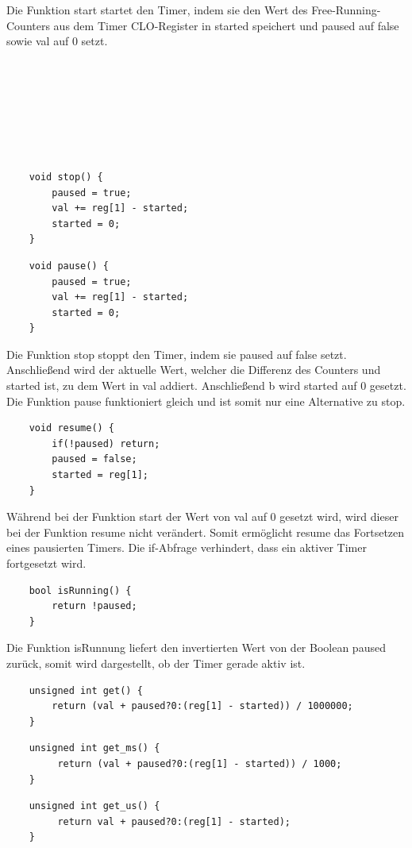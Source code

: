 \documentclass[12pt]{article}
\begin{document}
Die Funktion start startet den Timer, indem sie den Wert des Free-Running-Counters aus dem Timer CLO-Register in started speichert und paused auf false sowie val auf 0 setzt.\\\\\\\\\\\\\\\
\begin{verbatim}
    void stop() {
        paused = true;
        val += reg[1] - started;
        started = 0;
    }
\end{verbatim}
\begin{verbatim}
    void pause() {
        paused = true;
        val += reg[1] - started;
        started = 0;
    }
\end{verbatim}
Die Funktion stop stoppt den Timer, indem sie paused auf false setzt. Anschließend wird der aktuelle Wert, welcher die Differenz des Counters und started ist, zu dem Wert in val addiert. Anschließend b wird started auf 0 gesetzt. Die Funktion pause funktioniert gleich und ist somit nur eine Alternative zu stop.\\
\begin{verbatim}
    void resume() {
        if(!paused) return;
        paused = false;
        started = reg[1];
    }
\end{verbatim} 
Während bei der Funktion start der Wert von val auf 0 gesetzt wird, wird dieser bei der Funktion resume nicht verändert. Somit ermöglicht resume das Fortsetzen eines pausierten Timers. Die if-Abfrage verhindert, dass ein aktiver Timer fortgesetzt wird.\\
\begin{verbatim}
    bool isRunning() {
        return !paused;
    }
\end{verbatim}
Die Funktion isRunnung liefert den invertierten Wert von der Boolean paused zurück, somit wird dargestellt, ob der Timer gerade aktiv ist.\\
\begin{verbatim}
    unsigned int get() {
        return (val + paused?0:(reg[1] - started)) / 1000000;
    }
\end{verbatim}
\begin{verbatim}
    unsigned int get_ms() {
         return (val + paused?0:(reg[1] - started)) / 1000;
    }
\end{verbatim}
\begin{verbatim}
    unsigned int get_us() {
         return val + paused?0:(reg[1] - started);
    }
\end{verbatim}
\end{document}
